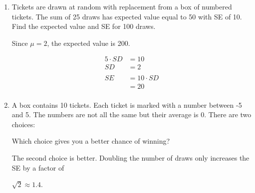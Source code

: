 \documentclass[portrait]{exam}
\begin{document}
\begin{enumerate}
    \item Tickets are drawn at random with replacement from a box of numbered
      tickets. The sum of 25 draws has expected value equal to 50 with SE of 10.
      Find the expected value and SE for 100 draws.

      \begin{solution}
        Since $\mu = 2$, the expected value is 200.

        \begin{align*}
          5 \cdot SD & = 10 \\
          SD   & = 2 \\
          \\
          SE   & = 10 \cdot SD \\
               & = 20 \\
        \end{align*}
        
      \end{solution}

    \item A box contains 10 tickets. Each ticket is marked with a number between
      -5 and 5. The numbers are not all the same but their average is 0. There
      are two choices:

      Which choice gives you a better chance of winning?

      \begin{solution}
        The second choice is better.  Doubling the number of draws only
        increases the SE by a factor of

        $\sqrt{2} \approx 1.4$. 




\end{solution}
\end{enumerate}
\end{document}
